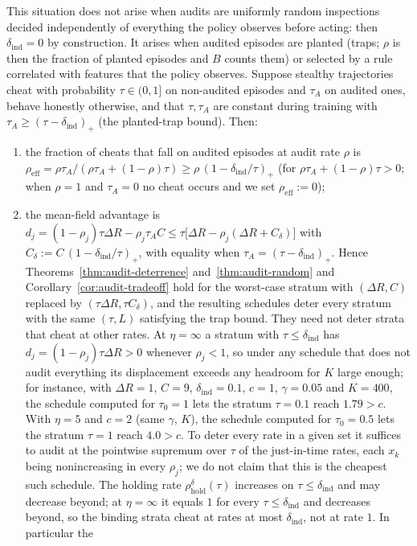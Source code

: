 \begin{proposition}
\label{prop:audit-indist}
This situation does not arise when audits are uniformly random inspections decided independently of everything the policy observes before acting: then $\delta_{\mathrm{ind}}=0$ by construction. It arises when audited episodes are planted (traps; $\rho$ is then the fraction of planted episodes and $B$ counts them) or selected by a rule correlated with features that the policy observes.
Suppose stealthy trajectories cheat with probability $\tau\in(0,1]$ on
non-audited episodes and $\tau_A$ on audited ones, behave honestly otherwise,
and that $\tau,\tau_A$ are constant during training with
$\tau_A\ge(\tau-\delta_{\mathrm{ind}})_+$ (the planted-trap bound). Then:
\begin{enumerate}
\item[\textup{(a)}] the fraction of cheats that fall on audited episodes at
audit rate $\rho$ is
$\rho_{\mathrm{eff}}=\rho\tau_A/(\rho\tau_A+(1-\rho)\tau)\ge\rho\,(1-\delta_{\mathrm{ind}}/\tau)_+$ (for $\rho\tau_A+(1-\rho)\tau>0$; when $\rho=1$ and $\tau_A=0$ no cheat occurs and we set $\rho_{\mathrm{eff}}:=0$);
\item[\textup{(b)}] the mean-field advantage is
$d_j=(1-\rho_j)\tau\Delta R-\rho_j\tau_AC\le\tau\bigl[\Delta R-\rho_j(\Delta R+C_\delta)\bigr]$
with $C_\delta:=C\,(1-\delta_{\mathrm{ind}}/\tau)_+$, with equality when
$\tau_A=(\tau-\delta_{\mathrm{ind}})_+$. Hence
Theorems~\ref{thm:audit-deterrence} and~\ref{thm:audit-random} and
Corollary~\ref{cor:audit-tradeoff} hold for the worst-case stratum with
$(\Delta R,C)$ replaced by $(\tau\Delta R,\tau C_\delta)$, and the resulting
schedules deter every stratum with the same $(\tau,L)$ satisfying the trap bound. They need not deter strata that cheat at other rates. At $\eta=\infty$ a stratum with $\tau\le\delta_{\mathrm{ind}}$ has $d_j=(1-\rho_j)\tau\Delta R>0$ whenever $\rho_j<1$, so under any schedule that does not audit everything its displacement exceeds any headroom for $K$ large enough; for instance, with $\Delta R=1$, $C=9$, $\delta_{\mathrm{ind}}=0.1$, $c=1$, $\gamma=0.05$ and $K=400$, the schedule computed for $\tau_0=1$ lets the stratum $\tau=0.1$ reach $1.79>c$. With $\eta=5$ and $c=2$ (same $\gamma$, $K$), the schedule computed for $\tau_0=0.5$ lets the stratum $\tau=1$ reach $4.0>c$. To deter every rate in a given set it suffices to audit at the pointwise supremum over $\tau$ of the just-in-time rates, each $x_k$ being nonincreasing in every $\rho_j$; we do not claim that this is the cheapest such schedule. The holding rate $\rho^{\delta}_{\mathrm{hold}}(\tau)$ increases on $\tau\le\delta_{\mathrm{ind}}$ and may decrease beyond; at $\eta=\infty$ it equals $1$ for every $\tau\le\delta_{\mathrm{ind}}$ and decreases beyond, so the binding strata cheat at rates at most $\delta_{\mathrm{ind}}$, not at rate $1$. In particular the

\end{enumerate}
\end{proposition}
